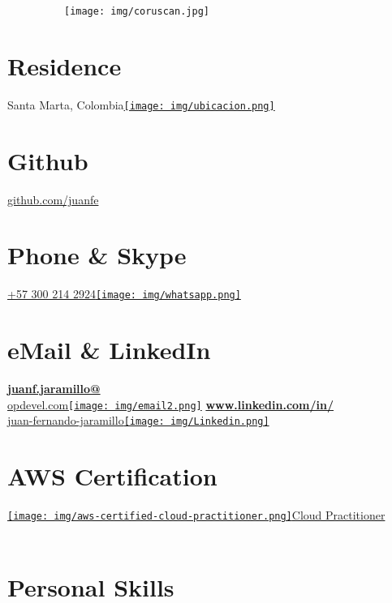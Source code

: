 \begin{aside}
    ~
    ~
    ~
    ~
    ~
    ~
  \texttt{[image: img/coruscan.jpg]}
    ~
  \section{Residence}
    Santa Marta, Colombia\href{https://www.google.com/maps/place/Santa+Marta,+Magdalena/@11.2315666,-74.2030395,14}{\texttt{[image: img/ubicacion.png]}}
    ~
    ~
  \section{Github}
    \href{https://github.com/juanfe}{github.com/juanfe}
  \section{Phone \& Skype}
    \href{callto:+573002142924}{+57 300 214 2924\texttt{[image: img/whatsapp.png]}}
    ~
    ~
    \section{eMail \& LinkedIn}
    \href{mailto:juanf.jaramillo@opdevel.com}{\small{\textbf{juanf.jaramillo@}\\opdevel.com}\texttt{[image: img/email2.png]}}
    \href{https://www.linkedin.com/in/juan-fernando-jaramillo/}{\textbf{www.linkedin.com/in/}\small{\\juan-fernando-jaramillo}\texttt{[image: img/Linkedin.png]}}
   ~
   ~
    \section{AWS Certification}
    \href{https://www.credly.com/badges/2a62b468-b67f-47cc-b7a6-8a8da5de9c4d/public_url}{\texttt{[image: img/aws-certified-cloud-practitioner.png]}Cloud Practitioner}
   ~
   ~
   ~
   ~
   ~
  \section{Personal Skills}
\end{aside}
